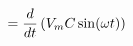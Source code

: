\documentclass[preview]{standalone}
\begin{document}
\begin{align*}
= {d \over dt} \left( V_m C \sin(\omega t) \right)
\end{align*}
\end{document}
